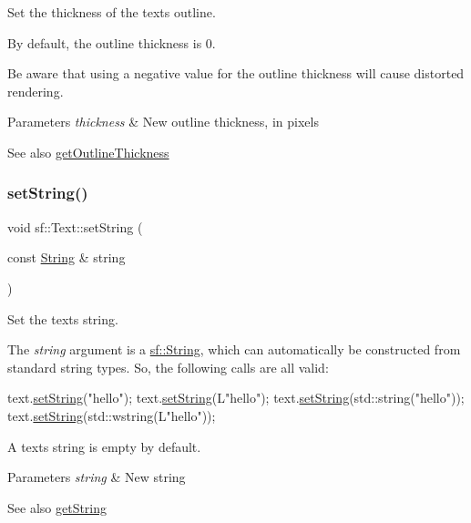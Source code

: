Set the thickness of the text\textquotesingle{}s outline. 

By default, the outline thickness is 0.

Be aware that using a negative value for the outline thickness will cause distorted rendering.


\begin{DoxyParams}{Parameters}
{\em thickness} & New outline thickness, in pixels\\
\hline
\end{DoxyParams}
\begin{DoxySeeAlso}{See also}
\hyperlink{classsf_1_1_text_af6bf01c23189edf52c8b38708db6f3f6}{get\+Outline\+Thickness} 
\end{DoxySeeAlso}
\mbox{\label{classsf_1_1_text_a7d3b3359f286fd9503d1ced25b7b6c33}} 
\subsubsection{\texorpdfstring{set\+String()}{setString()}}
{\footnotesize\ttfamily void sf\+::\+Text\+::set\+String (\begin{DoxyParamCaption}\item[{const \hyperlink{classsf_1_1_string}{String} \&}]{string }\end{DoxyParamCaption})}



Set the text\textquotesingle{}s string. 

The {\itshape string} argument is a \hyperlink{classsf_1_1_string}{sf\+::\+String}, which can automatically be constructed from standard string types. So, the following calls are all valid\+: 
\begin{DoxyCode}
text.\hyperlink{classsf_1_1_text_a7d3b3359f286fd9503d1ced25b7b6c33}{setString}(\textcolor{stringliteral}{"hello"});
text.\hyperlink{classsf_1_1_text_a7d3b3359f286fd9503d1ced25b7b6c33}{setString}(L\textcolor{stringliteral}{"hello"});
text.\hyperlink{classsf_1_1_text_a7d3b3359f286fd9503d1ced25b7b6c33}{setString}(std::string(\textcolor{stringliteral}{"hello"}));
text.\hyperlink{classsf_1_1_text_a7d3b3359f286fd9503d1ced25b7b6c33}{setString}(std::wstring(L\textcolor{stringliteral}{"hello"}));
\end{DoxyCode}
 A text\textquotesingle{}s string is empty by default.


\begin{DoxyParams}{Parameters}
{\em string} & New string\\
\hline
\end{DoxyParams}
\begin{DoxySeeAlso}{See also}
\hyperlink{classsf_1_1_text_a084c275eb4bca835696af5f8f9c80ab3}{get\+String} 
\end{DoxySeeAlso}
\mbox{\label{classsf_1_1_text_ad791702bc2d1b6590a1719aa60635edf}} 
